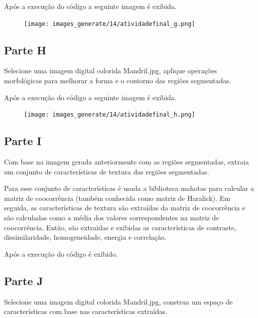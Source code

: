 \documentclass[10pt,a4paper]{article}
\begin{document}
Após a execução do código a seguinte imagem é exibida.

\begin{figure}[H]
    \centering
    {{\texttt{[image: images\_generate/14/atividadefinal\_g.png]}}}
\end{figure}

\subsection{Parte H}

Selecione uma imagem digital colorida Mandril.jpg, aplique operações morfológicas para melhorar a forma e o contorno das regiões segmentadas. 



Após a execução do código a seguinte imagem é exibida.

\begin{figure}[H]
    \centering
    {{\texttt{[image: images\_generate/14/atividadefinal\_h.png]}}}
\end{figure}

\subsection{Parte I}

Com base na imagem gerada anteriormente com as regiões segmentadas, extraia um conjunto de características de textura das regiões segmentadas. 

Para esse conjunto de características é usada a biblioteca mahotas para calcular a matriz de coocorrência (também conhecida como matriz de Haralick). Em seguida, as características de textura são extraídas da matriz de coocorrência e são calculadas como a média dos valores correspondentes na matriz de coocorrência. Então, são extraídas e exibidas as características de contraste, dissimilaridade, homogeneidade, energia e correlação.



Após a execução do código é exibido.



\subsection{Parte J}

Selecione uma imagem digital colorida Mandril.jpg, construa um espaço de características com base nas características extraídas. 
\end{document}
